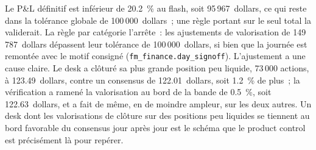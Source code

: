 \begin{omfigure}

\label{fig:fm:finance-product-control-and-tax:walk}
\end{omfigure}

Le P\&L définitif est inférieur de 20.2~\% au flash, soit 95\,967~dollars, ce qui reste dans la tolérance globale de 100\,000~dollars~; une règle portant sur le seul total la validerait. La
règle par catégorie l'arrête~: les ajustements de valorisation de 149\,787~dollars dépassent leur tolérance de 100\,000~dollars, si bien que la journée est remontée avec le motif consigné
(\texttt{fm\_finance.day\_signoff}). L'ajustement a une cause claire. Le desk a clôturé sa plus grande position peu liquide, 73\,000 actions, à
123.49~dollars, contre un consensus de 122.01~dollars, soit 1.2~\% de plus~; la vérification a ramené la valorisation au bord de la bande de 0.5~\%, soit 122.63~dollars, et a fait de même, en
de moindre ampleur, sur les deux autres. Un desk dont les valorisations de clôture sur des positions peu liquides se tiennent au bord favorable du consensus jour après jour est le
schéma que le product control est précisément là pour repérer.

